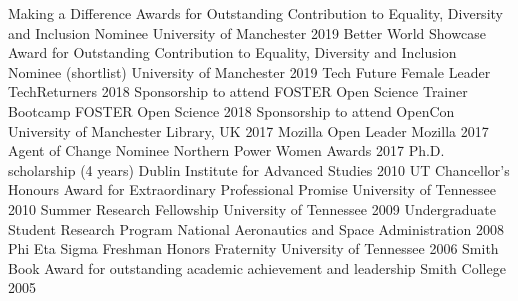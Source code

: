 \begin{cvpress}
 \cvpres
    {Making a Difference Awards for Outstanding Contribution to Equality, Diversity and Inclusion Nominee}
    {University of Manchester}
    {2019}
 \cvpres
    {Better World Showcase Award for Outstanding Contribution to Equality, Diversity and Inclusion Nominee (shortlist)}
    {University of Manchester}
    {2019}
 \cvpres
    {Tech Future Female Leader}
    {TechReturners}
    {2018}
 \cvpres
    {Sponsorship to attend FOSTER Open Science Trainer Bootcamp}
    {FOSTER Open Science}
    {2018}
 \cvpres
    {Sponsorship to attend OpenCon}
    {University of Manchester Library, UK}
    {2017}
 \cvpres
    {Mozilla Open Leader}
    {Mozilla}
    {2017}
  \cvpres
    {Agent of Change Nominee}
    {Northern Power Women Awards}
    {2017}  
    \cvpres
    {Ph.D. scholarship (4 years)}
    {Dublin Institute for Advanced Studies}
    {2010}
  \cvpres
    {UT Chancellor's Honours Award for Extraordinary Professional Promise}
    {University of Tennessee}
    {2010}
  \cvpres
    {Summer Research Fellowship}
    {University of Tennessee}
    {2009}
  \cvpres
    {Undergraduate Student Research Program}
    {National Aeronautics and Space Administration}
    {2008}
  \cvpres
    {Phi Eta Sigma Freshman Honors Fraternity}
    {University of Tennessee}
    {2006}
  \cvpres
    {Smith Book Award for outstanding academic achievement and leadership}
    {Smith College}
    {2005}
\end{cvpress}


